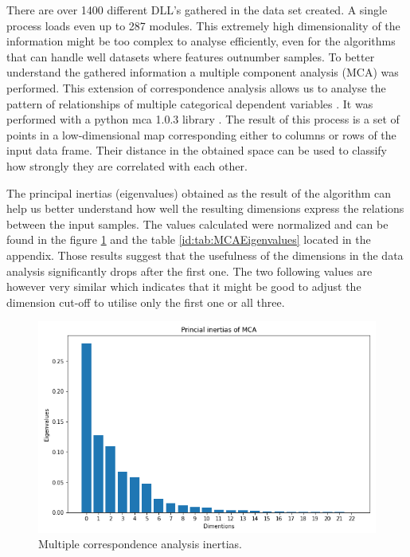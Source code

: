 \documentclass[a4paper,twoside,12pt]{book}
\begin{document}
There are over 1400 different DLL's gathered in the data set created. A single process loads 
even up to 287 modules. This extremely high dimensionality of the information might be too complex 
to analyse efficiently, even for the algorithms that can handle well datasets where features 
outnumber samples. To better understand the gathered information a multiple component 
analysis (MCA) was performed. This extension of correspondence analysis allows us to analyse the 
pattern of relationships of multiple categorical dependent variables \cite{bib:mca}. It was performed 
with a python mca 1.0.3 library \cite{bib:pymca}. The result of this process is a set of points in a 
low-dimensional map corresponding either to columns or rows of the input data frame. Their 
distance in the obtained space can be used to classify how strongly they are correlated with 
each other. 

The principal inertias (eigenvalues) obtained as the result of the algorithm can help us better 
understand how well the resulting dimensions express the relations between the input samples. 
The values calculated were normalized and can be found in the figure \ref{fig:mcaInertias} and 
the table \ref{id:tab:MCAEigenvalues} located in the appendix. Those results suggest that the 
usefulness of the dimensions in the data analysis significantly drops after the first one. The two
following values are however very similar which indicates that it might be good to adjust the 
dimension cut-off to utilise only the first one or all three.


\begin{figure}
	\centering
	\includegraphics[scale=0.9]{images/MCAEigenvalues}
	\caption{Multiple correspondence analysis inertias.}
	\label{fig:mcaInertias}
 \end{figure}
\end{document}
